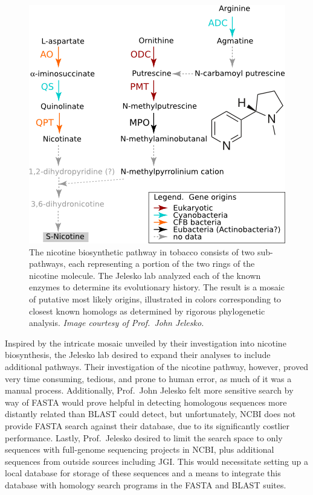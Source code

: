 \documentclass[11pt,letterpaper,twoside,english]{article}
\begin{document}
\begin{figure}[tbhp]
    \begin{center}
        \includegraphics[width=.6\linewidth]{figures/pyridine_alkaloid_biosynthesis}
    \end{center}
    \caption{The nicotine biosynthetic pathway in tobacco consists of two
    sub-pathways, each representing a portion of the two rings of the nicotine
    molecule. The Jelesko lab analyzed each of the known enzymes to determine
    its evolutionary history. The result is a mosaic of putative most likely
    origins, illustrated in colors corresponding to closest known homologs as
    determined by rigorous phylogenetic analysis. \textit{Image courtesy of
    Prof.~John Jelesko.}}
    \label{fig:nicotine}
\end{figure}

Inspired by the intricate mosaic unveiled by their investigation into nicotine
biosynthesis, the Jelesko lab desired to expand their analyses to include
additional pathways. Their investigation of the nicotine pathway, however,
proved very time consuming, tedious, and prone to human error, as much of it
was a manual process. Additionally, Prof.~John Jelesko felt more sensitive
search by way of FASTA \cite{pearson_improved_1988} would prove helpful in
detecting homologous sequences more distantly related than BLAST could detect,
but unfortunately, NCBI does not provide FASTA search against their database,
due to its significantly costlier performance. Lastly, Prof.~Jelesko desired
to limit the search space to only sequences with full-genome sequencing
projects in NCBI, plus additional sequences from outside sources including
JGI. This would necessitate setting up a local database for storage of these
sequences and a means to integrate this database with homology search programs
in the FASTA and BLAST suites.
\end{document}
